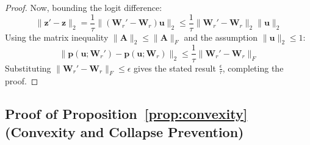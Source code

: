 \documentclass{article}
\theoremstyle{definition}
\begin{document}
\begin{proof}
Now, bounding the logit difference:
\begin{equation}
\|\mathbf{z}' - \mathbf{z}\|_2 = \frac{1}{\tau} \|(\mathbf{W}_r' - \mathbf{W}_r) \mathbf{u}\|_2 \le \frac{1}{\tau} \|\mathbf{W}_r' - \mathbf{W}_r\|_2 \|\mathbf{u}\|_2
\end{equation}
Using the matrix inequality $\|\mathbf{A}\|_2 \le \|\mathbf{A}\|_F$ and the assumption $\|\mathbf{u}\|_2 \le 1$:
\begin{equation}
\|\mathbf{p}(\mathbf{u}; \mathbf{W}_r') - \mathbf{p}(\mathbf{u}; \mathbf{W}_r)\|_2 \le \frac{1}{\tau} \|\mathbf{W}_r' - \mathbf{W}_r\|_F
\end{equation}
Substituting $\|\mathbf{W}_r' - \mathbf{W}_r\|_F \le \epsilon$ gives the stated result $\frac{\epsilon}{\tau}$, completing the proof.
\end{proof}

\subsection{Proof of Proposition~\ref{prop:convexity} (Convexity and Collapse Prevention)}
\label{subsec:proof_prop1}
\end{document}
